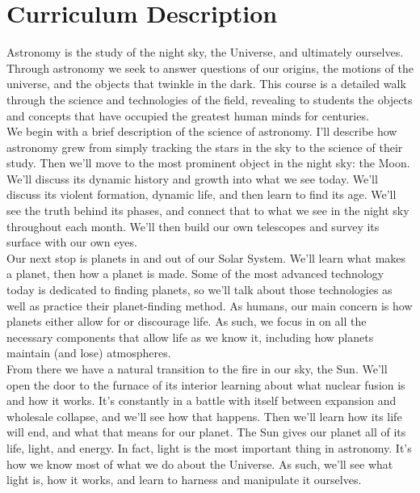 \section*{Curriculum Description}
Astronomy is the study of the night sky, the Universe, and ultimately ourselves. Through astronomy we seek to answer questions of our origins, the motions of the universe, and the objects that twinkle in the dark. This course is a detailed walk through the science and technologies of the field, revealing to students the objects and concepts that have occupied the greatest human minds for centuries.\\

We begin with a brief description of the science of astronomy. I'll describe how astronomy grew from  simply tracking the stars in the sky to the science of their study. Then we'll move to the most prominent object in the night sky: the Moon. We'll discuss its dynamic history and growth into what we see today. We'll discuss its violent formation, dynamic life, and then learn to find its age.  We'll see the truth behind its phases, and connect that to what we see in the night sky throughout each month. We'll then build our own telescopes and survey its surface with our own eyes.\\

Our next stop is planets in and out of our Solar System. We'll learn what makes a planet, then how a planet is made. Some of the most advanced technology today is dedicated to finding planets, so we'll talk about those technologies as well as practice their planet-finding method. As humans, our main concern is how planets either allow for or discourage life. As such, we focus in on all the necessary components that allow life as we know it, including how planets maintain (and lose) atmospheres.\\

From there we have a natural transition to the fire in our sky, the Sun. We'll open the door to the furnace of its interior learning about what nuclear fusion is and how it works. It's constantly in a battle with itself between expansion and wholesale collapse, and we'll see how that happens. Then we'll learn how its life will end, and what that means for our planet. The Sun gives our planet all of its life, light, and energy. In fact, light is the most important thing in astronomy. It's how we know most of what we do about the Universe. As such, we'll see what light is, how it works, and learn to harness and manipulate it ourselves.\\

